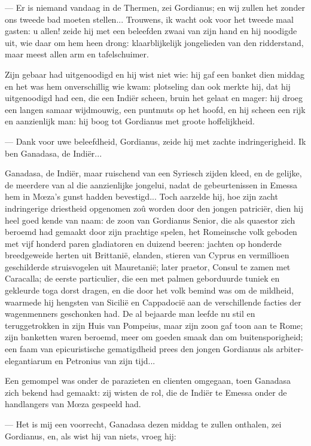 \documentclass[a4paper, 12pt, oneside, dutch]{article}
\begin{document}
--- Er is niemand vandaag in de Thermen, zei Gordianus; en wij zullen het zonder ons tweede bad moeten stellen... Trouwens, ik wacht ook voor het tweede maal gasten: u allen! zeide hij met een beleefden zwaai van zijn hand en hij noodigde uit, wie daar om hem heen drong: klaarblijkelijk jongelieden van den ridderstand, maar meest allen arm en tafelschuimer.

Zijn gebaar had uitgenoodigd en hij wist niet wie: hij gaf een banket dien middag en het was hem onverschillig wie kwam: plotseling dan ook merkte hij, dat hij uitgenoodigd had een, die een Indiër scheen, bruin het gelaat en mager: hij droeg een langen samaar wijdmouwig, een puntmuts op het hoofd, en hij scheen een rijk en aanzienlijk man: hij boog tot Gordianus met groote hoffelijkheid.

--- Dank voor uwe beleefdheid, Gordianus, zeide hij met zachte indringerigheid. Ik ben Ganadasa, de Indiër...

Ganadasa, de Indiër, maar ruischend van een Syriesch zijden kleed, en de gelijke, de meerdere van al die aanzienlijke jongelui, nadat de gebeurtenissen in Emessa hem in Mœza's gunst hadden bevestigd... Toch aarzelde hij, hoe zijn zacht indringerige driestheid opgenomen zoû worden door den jongen patriciër, dien hij heel goed kende van naam: de zoon van Gordianus Senior, die als quaestor zich beroemd had gemaakt door zijn prachtige spelen, het Romeinsche volk geboden met vijf honderd paren gladiatoren en duizend beeren: jachten op honderde breedgeweide herten uit Brittanië, elanden, stieren van Cyprus en vermillioen geschilderde struisvogelen uit Mauretanië; later praetor, Consul te zamen met Caracalla; de eerste particulier, die een met palmen geborduurde tuniek en gekleurde toga dorst dragen, en die door het volk bemind was om de mildheid, waarmede hij hengsten van Sicilië en Cappadocië aan de verschillende facties der wagenmenners geschonken had. De al bejaarde man leefde nu stil en teruggetrokken in zijn Huis van Pompeius, maar zijn zoon gaf toon aan te Rome; zijn banketten waren beroemd, meer om goeden smaak dan om buitensporigheid; een faam van epicuristische gematigdheid prees den jongen Gordianus als arbiter-elegantiarum en Petronius van zijn tijd...

Een gemompel was onder de parazieten en clienten omgegaan, toen Ganadasa zich bekend had gemaakt: zij wisten de rol, die de Indiër te Emessa onder de handlangers van Mœza gespeeld had.

--- Het is mij een voorrecht, Ganadasa dezen middag te zullen onthalen, zei Gordianus, en, als wist hij van niets, vroeg hij:
\end{document}
